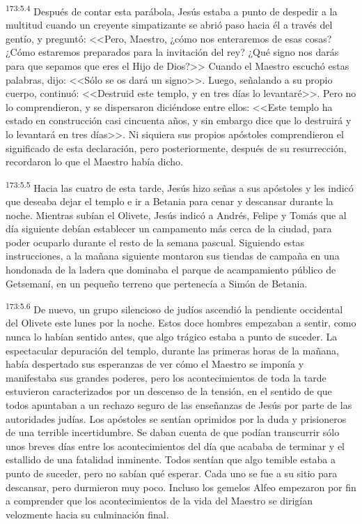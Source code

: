 \par 
\textsuperscript{173:5.4} Después de contar esta parábola, Jesús estaba a punto de despedir a la multitud cuando un creyente simpatizante se abrió paso hacia él a través del gentío, y preguntó: <<Pero, Maestro, ¿cómo nos enteraremos de esas cosas? ¿Cómo estaremos preparados para la invitación del rey? ¿Qué signo nos darás para que sepamos que eres el Hijo de Dios?>> Cuando el Maestro escuchó estas palabras, dijo: <<Sólo se os dará un signo>>. Luego, señalando a su propio cuerpo, continuó: <<Destruid este templo, y en tres días lo levantaré>>. Pero no lo comprendieron, y se dispersaron diciéndose entre ellos: <<Este templo ha estado en construcción casi cincuenta años, y sin embargo dice que lo destruirá y lo levantará en tres días>>. Ni siquiera sus propios apóstoles comprendieron el significado de esta declaración, pero posteriormente, después de su resurrección, recordaron lo que el Maestro había dicho.

\par 
\textsuperscript{173:5.5} Hacia las cuatro de esta tarde, Jesús hizo señas a sus apóstoles y les indicó que deseaba dejar el templo e ir a Betania para cenar y descansar durante la noche. Mientras subían el Olivete, Jesús indicó a Andrés, Felipe y Tomás que al día siguiente debían establecer un campamento más cerca de la ciudad, para poder ocuparlo durante el resto de la semana pascual. Siguiendo estas instrucciones, a la mañana siguiente montaron sus tiendas de campaña en una hondonada de la ladera que dominaba el parque de acampamiento público de Getsemaní, en un pequeño terreno que pertenecía a Simón de Betania.

\par 
\textsuperscript{173:5.6} De nuevo, un grupo silencioso de judíos ascendió la pendiente occidental del Olivete este lunes por la noche. Estos doce hombres empezaban a sentir, como nunca lo habían sentido antes, que algo trágico estaba a punto de suceder. La espectacular depuración del templo, durante las primeras horas de la mañana, había despertado sus esperanzas de ver cómo el Maestro se imponía y manifestaba sus grandes poderes, pero los acontecimientos de toda la tarde estuvieron caracterizados por un descenso de la tensión, en el sentido de que todos apuntaban a un rechazo seguro de las enseñanzas de Jesús por parte de las autoridades judías. Los apóstoles se sentían oprimidos por la duda y prisioneros de una terrible incertidumbre. Se daban cuenta de que podían transcurrir sólo unos breves días entre los acontecimientos del día que acababa de terminar y el estallido de una fatalidad inminente. Todos sentían que algo temible estaba a punto de suceder, pero no sabían qué esperar. Cada uno se fue a su sitio para descansar, pero durmieron muy poco. Incluso los gemelos Alfeo empezaron por fin a comprender que los acontecimientos de la vida del Maestro se dirigían velozmente hacia su culminación final.